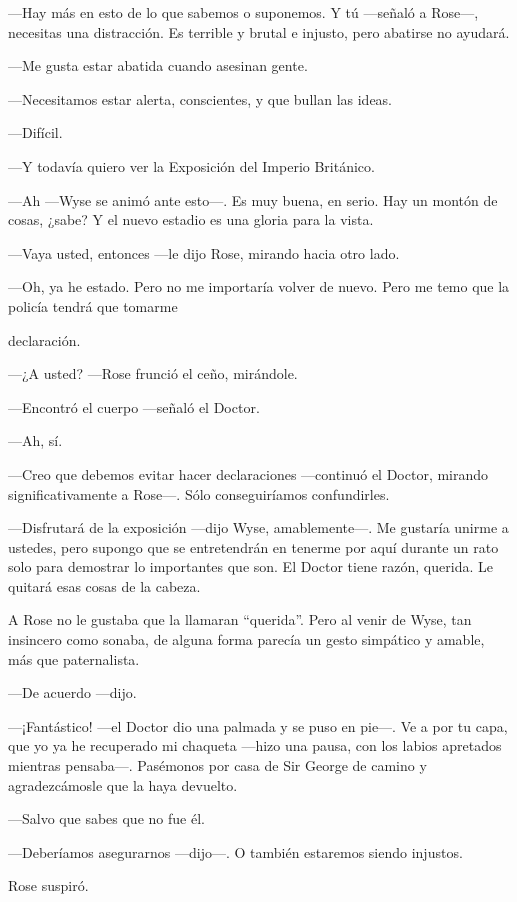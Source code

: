 {---Hay más en esto de lo que sabemos o suponemos. Y tú ---señaló a
	Rose---, necesitas una distracción. Es terrible y brutal e injusto, pero
abatirse no ayudará.}

{---Me gusta estar abatida cuando asesinan gente.}

{---Necesitamos estar alerta, conscientes, y que bullan las ideas.}

{---Difícil.}

{---Y todavía quiero ver la Exposición del Imperio Británico.}

{---Ah ---Wyse se animó ante esto---. Es muy buena, en serio. Hay un
	montón de cosas, ¿sabe? Y el nuevo estadio es una gloria para la
vista.}

{---Vaya usted, entonces ---le dijo Rose, mirando hacia otro lado.}

{---Oh, ya he estado. Pero no me importaría volver de nuevo. Pero me
temo que la policía tendrá que tomarme}

{declaración.}

{---¿A usted? ---Rose frunció el ceño, mirándole.}

{---Encontró el cuerpo ---señaló el Doctor.}

{---Ah, sí.}

{---Creo que debemos evitar hacer declaraciones ---continuó el Doctor,
mirando significativamente a Rose---. Sólo conseguiríamos confundirles.}

{---Disfrutará de la exposición ---dijo Wyse, amablemente---. Me
	gustaría unirme a ustedes, pero supongo que se entretendrán en tenerme
	por aquí durante un rato solo para demostrar lo importantes que son. El
Doctor tiene razón, querida. Le quitará esas cosas de la cabeza.}

{A Rose no le gustaba que la llamaran ``querida''. Pero al venir de
	Wyse, tan insincero como sonaba, de alguna forma parecía un gesto
simpático y amable, más que paternalista.}

{---De acuerdo ---dijo.}

{---¡Fantástico! ---el Doctor dio una palmada y se puso en pie---. Ve a
	por tu capa, que yo ya he recuperado mi chaqueta ---hizo una pausa, con
	los labios apretados mientras pensaba---. Pasémonos por casa de Sir
George de camino y agradezcámosle que la haya devuelto.}

{---Salvo que sabes que no fue él.}

{---Deberíamos asegurarnos ---dijo---. O también estaremos siendo
injustos.}

{Rose suspiró.}

